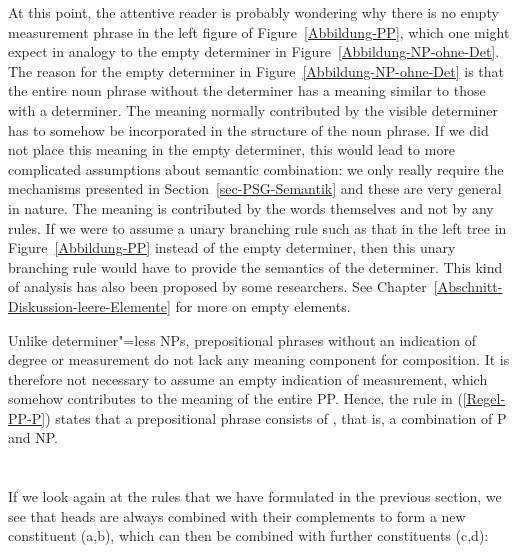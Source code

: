 At this point, the attentive reader is probably wondering why there is no empty measurement phrase in
the left figure of Figure~\ref{Abbildung-PP}, which one might expect in analogy to the empty determiner in Figure~\ref{Abbildung-NP-ohne-Det}.
The reason for the empty determiner in Figure~\ref{Abbildung-NP-ohne-Det} is that the entire noun phrase
without the determiner has a meaning similar to those with a determiner. The meaning normally contributed
by the visible determiner has to somehow be incorporated in the structure of the noun phrase. If we
did not place this meaning in the empty determiner, this would lead to more complicated assumptions about semantic
combination: we only really require the mechanisms presented in Section~\ref{sec-PSG-Semantik} and these are
very general in nature. The meaning is contributed by the words themselves and not by any rules. If we were
to assume a unary branching rule such as that in the left tree in Figure~\ref{Abbildung-PP} instead of the
empty determiner, then this unary branching rule would have to provide the semantics of the determiner. This
kind of analysis has also been proposed by some researchers. See Chapter~\ref{Abschnitt-Diskussion-leere-Elemente} for
more on empty elements.

Unlike determiner"=less NPs, prepositional phrases without an indication of degree or measurement do
not lack any meaning component for composition. It is therefore not necessary to assume an empty indication of measurement, which
somehow contributes to the meaning of the entire PP. Hence, the rule in (\ref{Regel-PP-P}) states that a
prepositional phrase consists of \pbar, that is, a combination of P and NP.

\section{\xbart}
\label{sec-xbar}

\largerpage[2]
If  we look again at the rules that we have formulated in the previous section, we see that heads are always 
combined with their complements to form a new constituent (a,b), which can then be combined with further constituents (c,d):

